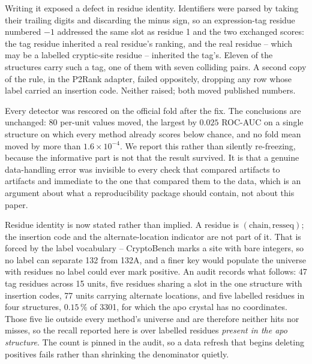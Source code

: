 \documentclass[11pt]{article}
\begin{document}
Writing it exposed a defect in residue identity. Identifiers were parsed by
taking their trailing digits and discarding the minus sign, so an
expression-tag residue numbered \(-1\) addressed the same slot as residue 1 and
the two exchanged scores: the tag residue inherited a real residue's ranking,
and the real residue -- which may be a labelled cryptic-site residue -- inherited
the tag's. Eleven of the \NUnits{} structures carry such a tag, one of them with
seven colliding pairs. A second copy of the rule, in the P2Rank adapter, failed
oppositely, dropping any row whose label carried an insertion code. Neither
raised; both moved published numbers.

Every detector was rescored on the official fold after the fix. The conclusions
are unchanged: 80 per-unit values moved, the largest by \(0.025\) ROC-AUC on a
single structure on which every method already scores below chance, and no fold
mean moved by more than \(1.6\times10^{-4}\). We report this rather than
silently re-freezing, because the informative part is not that the result
survived. It is that a genuine data-handling error was invisible to every check
that compared artifacts to artifacts and immediate to the one that compared them
to the data, which is an argument about what a reproducibility package should
contain, not about this paper.

Residue identity is now stated rather than implied. A residue is
\((\text{chain}, \text{resseq})\); the insertion code and the alternate-location
indicator are not part of it. That is forced by the label vocabulary --
CryptoBench marks a site with bare integers, so no label can separate 132 from
132A, and a finer key would populate the universe with residues no label could
ever mark positive. An audit records what follows: 47 tag residues across 15
units, five residues sharing a slot in the one structure with insertion codes,
77 units carrying alternate locations, and five labelled residues in four
structures, \(0.15\,\%\) of 3301, for which the apo crystal has no coordinates.
Those five lie outside every method's universe and are therefore neither hits
nor misses, so the recall reported here is over labelled residues \emph{present
in the apo structure}. The count is pinned in the audit, so a data refresh that
begins deleting positives fails rather than shrinking the denominator quietly.






\end{document}
